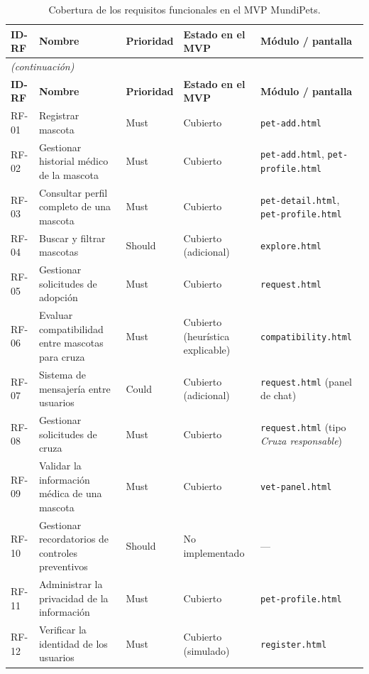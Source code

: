 \documentclass[journal,onecolumn]{IEEEtran}
\begin{document}
	\begin{longtable}{@{}p{1.5cm} p{5.2cm} p{1.7cm} p{3.0cm} p{3.4cm}@{}}
		\caption{Cobertura de los requisitos funcionales en el MVP MundiPets.}
		\label{tab:cobertura-mvp} \\
		\hline
		\textbf{ID-RF} & \textbf{Nombre} & \textbf{Prioridad} & \textbf{Estado en el MVP} & \textbf{Módulo / pantalla} \\
		\hline
		\endfirsthead
		\multicolumn{5}{|l|}{\textit{(continuación)}} \\
		\hline
		\textbf{ID-RF} & \textbf{Nombre} & \textbf{Prioridad} & \textbf{Estado en el MVP} & \textbf{Módulo / pantalla} \\
		\hline
		\endhead
		\hline
		\endfoot
		RF-01 & Registrar mascota & Must & Cubierto & \texttt{pet-add.html} \\
		\hline
		RF-02 & Gestionar historial médico de la mascota & Must & Cubierto & \texttt{pet-add.html}, \texttt{pet-profile.html} \\
		\hline
		RF-03 & Consultar perfil completo de una mascota & Must & Cubierto & \texttt{pet-detail.html}, \texttt{pet-profile.html} \\
		\hline
		RF-04 & Buscar y filtrar mascotas & Should & Cubierto (adicional) & \texttt{explore.html} \\
		\hline
		RF-05 & Gestionar solicitudes de adopción & Must & Cubierto & \texttt{request.html} \\
		\hline
		RF-06 & Evaluar compatibilidad entre mascotas para cruza & Must & Cubierto (heurística explicable) & \texttt{compatibility.html} \\
		\hline
		RF-07 & Sistema de mensajería entre usuarios & Could & Cubierto (adicional) & \texttt{request.html} (panel de chat) \\
		\hline
		RF-08 & Gestionar solicitudes de cruza & Must & Cubierto & \texttt{request.html} (tipo \emph{Cruza responsable}) \\
		\hline
		RF-09 & Validar la información médica de una mascota & Must & Cubierto & \texttt{vet-panel.html} \\
		\hline
		RF-10 & Gestionar recordatorios de controles preventivos & Should & No implementado & --- \\
		\hline
		RF-11 & Administrar la privacidad de la información & Must & Cubierto & \texttt{pet-profile.html} \\
		\hline
		RF-12 & Verificar la identidad de los usuarios & Must & Cubierto (simulado) & \texttt{register.html} \\

\end{longtable}
\end{document}
